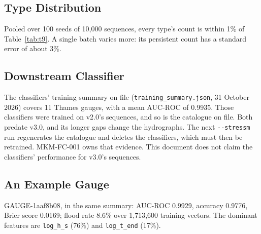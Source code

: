\documentclass[11pt,a4paper]{article}
\begin{document}
\subsection{Type Distribution}
Pooled over 100 seeds of 10{,}000 sequences, every type's count is within 1\% of
Table~\ref{tab:t9}. A single batch varies more: its persistent count has a standard error
of about 3\%.

\subsection{Downstream Classifier}
The classifiers' training summary on file (\texttt{training\_summary.json}, 31 October
2026) covers 11 Thames gauges, with a mean AUC-ROC of 0.9935. Those classifiers were
trained on v2.0's sequences, and so is the catalogue on file. Both predate v3.0, and its
longer gaps change the hydrographs. The next \texttt{-{}-stressm} run regenerates the
catalogue and deletes the classifiers, which must then be retrained. MKM-FC-001 owns that
evidence. This document does not claim the classifiers' performance for v3.0's sequences.

\subsection{An Example Gauge}
GAUGE-1aaf8b08, in the same summary: AUC-ROC 0.9929, accuracy 0.9776, Brier score 0.0169;
flood rate 8.6\% over 1{,}713{,}600 training vectors. The dominant features are
\texttt{log\_h\_s} (76\%) and \texttt{log\_t\_end} (17\%).

\mkmlimitations
\end{document}
